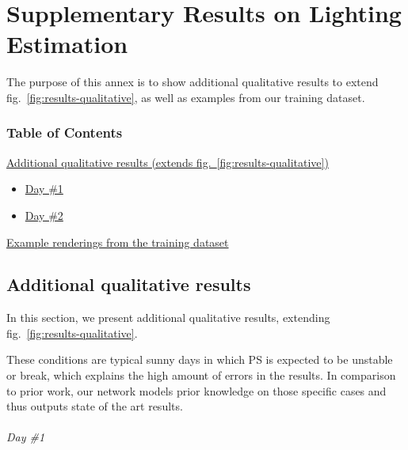 \chapter{Supplementary Results on Lighting Estimation}     %
\label{annex3}

\graphicspath{{annex3_figures/}}

The purpose of this annex is to show additional qualitative results
to extend fig.~\ref{fig:results-qualitative}, as well as examples from our training dataset.

\hypertarget{an3-table-of-contents}{%
\subsection{Table of Contents}\label{an3-table-of-contents}}

\protect\hyperlink{extraresults}{Additional qualitative results (extends
fig.~\ref{fig:results-qualitative})}

\begin{itemize}
\tightlist
\item
  \protect\hyperlink{extraresultsd2}{Day \#1}
\item
  \protect\hyperlink{extraresultsd2}{Day \#2}
\end{itemize}

\protect\hyperlink{trainingrenders}{Example renderings from the training
dataset}

\protect\hypertarget{extraresults}{}{}

\hypertarget{additional-qualitative-results}{%
\section{Additional qualitative
results}\label{additional-qualitative-results}}

In this section, we present additional qualitative results, extending
fig.~\ref{fig:results-qualitative}.

These conditions are typical sunny days in which PS is expected to be
unstable or break, which explains the high amount of errors in the
results. In comparison to prior work, our network models prior knowledge
on those specific cases and thus outputs state of the art results.

\clearpage

\hypertarget{day-1}{%
\subparagraph{Day \#1}\label{day-1}}


